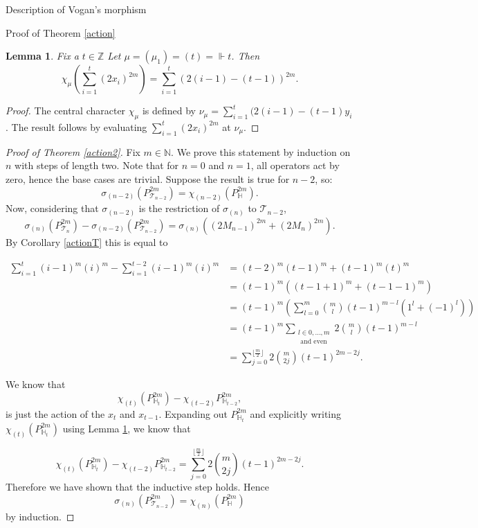 \documentclass[a4paper,10pt]{amsart}
\newtheorem{lemma}[theorem]{Lemma}
\begin{document}
\begin{section}{Description of Vogan's morphism}
\begin{subsection}{Proof of Theorem \ref{action}}
\begin{lemma}\label{actionH} Fix a $t \in \mathbb{Z}$ Let $\mu = (\mu_1)= (t) = \Vdash t$. Then
$$\chi_\mu (\sum_{i=1}^t  (2x_i)^{2m} ) = \sum_{i=1}^{t} (2(i-1)-(t-1))^{2m}.$$
\end{lemma} 

\begin{proof} The central character $\chi_\mu$ is defined by $\nu_\mu = \sum_{i=1}^{t} (2(i-1) - (t-1)y_i$.  The result follows by evaluating $\sum_{i=1}^t  (2x_i)^{2m}$ at $\nu_\mu$.   \end{proof} 

\begin{proof}[Proof of Theorem \ref{action2}] Fix $m \in \mathbb{N}$.
We prove this statement by induction on $n$ with steps of length two. Note that for $n=0$ and $n=1$, all operators act by zero, hence the base cases are trivial. 
Suppose the result is true for $n-2$, so: $$\sigma_{(n-2)}(P_{\mathcal{T}_{n-2}}^{2m}) = \chi_{(n-2)} (P_{\mathbb{H}}^{2m}).$$
Now, considering that $\sigma_{(n-2)}$ is the restriction of $\sigma_{(n)}$ to $\mathcal{T}_{n-2}$,
$$\sigma_{(n)}(P_{\mathcal{T}_{n}}^{2m}) - \sigma_{(n-2)}(P_{\mathcal{T}_{n-2}}^{2m}) = \sigma_{(n)}( (2M_{n-1})^{2m} + (2M_{n})^{2m}).$$
By Corollary \ref{actionT} this is equal to 

\begin{equation*}
\begin{split}
\sum_{i=1}^{t} (i-1)^m(i)^m - \sum_{i=1}^{t-2} (i-1)^m(i)^m & =   (t-2)^m(t-1)^m + (t-1)^m(t)^m\\
& = (t-1)^m ((t-1 + 1)^m + (t-1 -1 )^m ) \\
&= (t-1)^m (\sum_{l=0}^m {m\choose l} (t-1)^{m-l} (1^l + (-1)^l))\\
& = (t-1)^m\sum_{\substack{l \in {0,\ldots ,m} \\\text{ and even} }} 2 {m\choose l} (t-1)^{m-l}\\
 & = \sum_{j = 0}^{\lfloor \frac{m}{2} \rfloor} 2 {m \choose 2j} (t-1)^{2m-2j}.
 \end{split} \end{equation*}

We know that  
$$\chi_{(t)}(P_{\mathbb{H}_t}^{2m}) - \chi_{(t-2)}P_{\mathbb{H}_{t-2}}^{2m},$$
is just the action of the $x_{t}$ and $x_{t-1}$. Expanding out $P_{\mathbb{H}_t}^{2m}$ and explicitly writing $\chi_{(t)}(P_{\mathbb{H}_t}^{2m})$ using Lemma \ref{actionH}, we know that 
 
$$\chi_{(t)}(P_{\mathbb{H}_t}^{2m}) - \chi_{(t-2)}P_{\mathbb{H}_{t-2}}^{2m}= \sum_{j = 0}^{\lfloor \frac{m}{2} \rfloor} 2 {m \choose 2j} (t-1)^{2m-2j}.$$
Therefore we have shown that the inductive step holds. Hence 
$$\sigma_{(n)}(P_{\mathcal{T}_{n-2}}^{2m}) = \chi_{(n)} (P_{\mathbb{H}}^{2m})$$
by induction. \end{proof}


\end{subsection}
\end{section}
\end{document}
